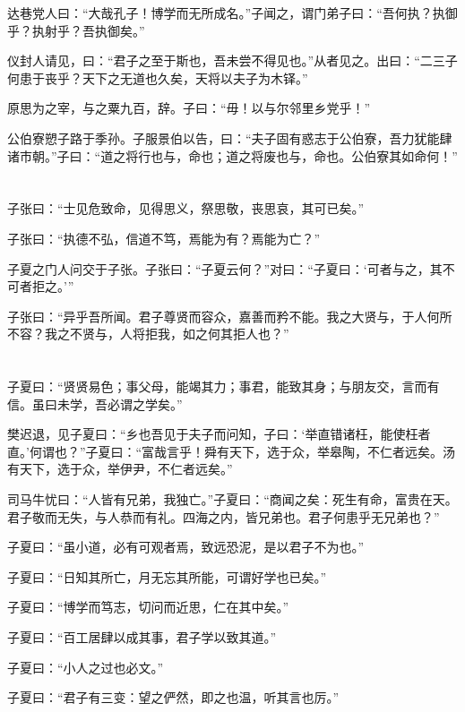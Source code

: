 \documentclass[a5paper]{ctexbook}
\begin{document}
    达巷党人曰：“大哉孔子！博学而无所成名。”子闻之，谓门弟子曰：“吾何执？执御乎？执射乎？吾执御矣。”

    仪封人请见，曰：“君子之至于斯也，吾未尝不得见也。”从者见之。出曰：“二三子何患于丧乎？天下之无道也久矣，天将以夫子为木铎。”

    原思为之宰，与之粟九百，辞。子曰：“毋！以与尔邻里乡党乎！”

    公伯寮愬子路于季孙。子服景伯以告，曰：“夫子固有惑志于公伯寮，吾力犹能肆诸市朝。”子曰：“道之将行也与，命也；道之将废也与，命也。公伯寮其如命何！”

    \chapter{}

    子张曰：“士见危致命，见得思义，祭思敬，丧思哀，其可已矣。” 
    
    子张曰：“执德不弘，信道不笃，焉能为有？焉能为亡？” 
    
    子夏之门人问交于子张。子张曰：“子夏云何？”对曰：“子夏曰：‘可者与之，其不可者拒之。’”
    
    子张曰：“异乎吾所闻。君子尊贤而容众，嘉善而矜不能。我之大贤与，于人何所不容？我之不贤与，人将拒我，如之何其拒人也？”

    \chapter{}

    子夏曰：“贤贤易色；事父母，能竭其力；事君，能致其身；与朋友交，言而有信。虽曰未学，吾必谓之学矣。”

    樊迟退，见子夏曰：“乡也吾见于夫子而问知，子曰：‘举直错诸枉，能使枉者直。’何谓也？”子夏曰：“富哉言乎！舜有天下，选于众，举皋陶，不仁者远矣。汤有天下，选于众，举伊尹，不仁者远矣。”

    司马牛忧曰：“人皆有兄弟，我独亡。”子夏曰：“商闻之矣：死生有命，富贵在天。君子敬而无失，与人恭而有礼。四海之内，皆兄弟也。君子何患乎无兄弟也？”

    子夏曰：“虽小道，必有可观者焉，致远恐泥，是以君子不为也。” 
    
    子夏曰：“日知其所亡，月无忘其所能，可谓好学也已矣。” 
    
    子夏曰：“博学而笃志，切问而近思，仁在其中矣。”

    子夏曰：“百工居肆以成其事，君子学以致其道。” 
    
    子夏曰：“小人之过也必文。” 
    
    子夏曰：“君子有三变：望之俨然，即之也温，听其言也厉。”
\end{document}

